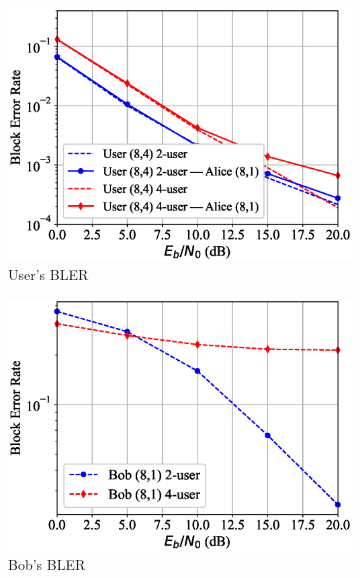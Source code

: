 \begin{figure}[tp!]
	\begin{subfigure}{0.28\textwidth}
		\includegraphics[width=\linewidth]{figs/multi_covert_autoencoder_bler_rician}
		\caption{User's BLER}
		\label{fig:multi_rician_results_ae}
	\end{subfigure}
	\hspace*{\fill}
	\begin{subfigure}{0.28\textwidth}
		\includegraphics[width=\linewidth]{figs/multi_bob_bler_rician}
		\caption{Bob's BLER}
		\label{fig:multi_rician_results_bob}	
	\end{subfigure}
	\hspace*{\fill}
	\begin{subfigure}{0.28\textwidth}

\end{subfigure}
\end{figure}
